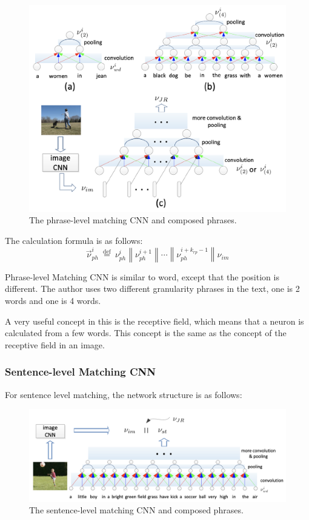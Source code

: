\begin{figure}[h!]
\centering
\includegraphics[width=\textwidth]{mccns2.pdf}
\caption{ The phrase-level matching CNN and composed phrases. \cite{ma2015multimodal}}
\label{fig:mccns2}
\end{figure}

The calculation formula is as follows:
$$
\vec{\nu}_{p h}^{i} \stackrel{\text { def }}{=} \nu_{p h}^{i}\left\|\nu_{p h}^{i+1}\right\| \cdots\left\|\nu_{p h}^{i+k_{r p}-1}\right\| \nu_{i m}
$$

Phrase-level Matching CNN is similar to word, except that the position is different. The author uses two different granularity phrases in the text, one is 2 words and one is 4 words.

A very useful concept in this is the receptive field, which means that a neuron is calculated from a few words. This concept is the same as the concept of the receptive field in an image.

\subsubsection{Sentence-level Matching CNN}
For sentence level matching, the network structure is as follows:

\begin{figure}[h!]
\centering
\includegraphics[width=\textwidth]{mcnns3.pdf}
\caption{The sentence-level matching CNN and composed phrases. \cite{ma2015multimodal}}
\label{fig:mccns3}
\end{figure}

